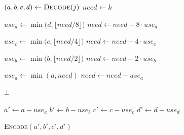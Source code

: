 \begin{algorithm}[t!]
\begin{footnotesize}
\begin{algorithmic}[1]
\vspace{0.5em}
    \State $(a,b,c,d) \gets \textsc{Decode}(j)$
    \State $need \gets k$

    \State $use_d \gets \min\bigl(d, \lfloor need/8 \rfloor\bigr)$
    \State $need \gets need - 8 \cdot use_d$

    \State $use_c \gets \min\bigl(c, \lfloor need/4 \rfloor\bigr)$
    \State $need \gets need - 4 \cdot use_c$

    \State $use_b \gets \min\bigl(b, \lfloor need/2 \rfloor\bigr)$
    \State $need \gets need - 2 \cdot use_b$

    \State $use_a \gets \min(a, need)$
    \State $need \gets need - use_a$

        \State \Return $\bot$ 
    \EndIf

    \State $a' \gets a - use_a$
    \State $b' \gets b - use_b$
    \State $c' \gets c - use_c$
    \State $d' \gets d - use_d$

    \State \Return \textsc{Encode}$(a',b',c',d')$
\EndFunction

\end{algorithmic}
\end{footnotesize}
\end{algorithm}
